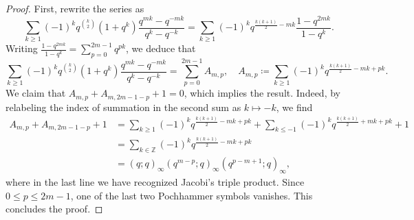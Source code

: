 \documentclass[10pt,a4paper]{amsart}
\newcommand{\Z}{\mathbb{Z}}
\begin{document}
\begin{proof}
    First, rewrite the series as
	\begin{equation}
		\sum_{k \ge 1}
		(-1)^{k}
		q^{\binom{k}{2}} (1 + q^k)
			\frac{q^{mk} - q^{-mk}}{q^k - q^{-k}}
		=
		\sum_{k \ge 1}
			  (-1)^{k}
			q^{\frac{k(k+1)}{2} - mk}
			  \frac{1 - q^{2mk}}{1 - q^k} .
	\end{equation}
	Writing $\frac{1 - q^{2mk}}{1 - q^k} = \sum_{p = 0}^{2m-1} q^{pk}$, we deduce that
	\begin{equation}
		\sum_{k \ge 1}
		(-1)^{k}
		q^{\binom{k}{2}} (1 + q^k)
			\frac{q^{mk} - q^{-mk}}{q^k - q^{-k}}
		=
		\sum_{p = 0}^{2m-1} A_{m,p},
		\quad
		A_{m,p}
		\coloneqq
		\sum_{k \ge 1}
			  (-1)^{k}
			q^{\frac{k(k+1)}{2} - mk + pk}.
	\end{equation}
	We claim that $A_{m,p} + A_{m,2m-1-p} + 1 = 0$, which implies the result. Indeed, by relabeling the index of summation in the second sum as $k \mapsto -k$, we find
	\begin{equation}
	\begin{split}
		A_{m,p} + A_{m,2m-1-p} + 1
		&=
		\sum_{k \ge 1}
			  (-1)^{k}
			q^{\frac{k(k+1)}{2} - mk + pk}
		+
		\sum_{k \le -1}
			  (-1)^{k}
			q^{\frac{k(k+1)}{2} + mk + pk}
		+ 1 \\
		&=
		\sum_{k \in \Z}
			  (-1)^{k}
			q^{\frac{k(k+1)}{2} - mk + pk} \\
		&=
		(q;q)_{\infty} (q^{m-p};q)_{\infty} (q^{p-m+1};q)_{\infty},
	\end{split}
	\end{equation}
	where in the last line we have recognized Jacobi's triple product. Since $0 \le p \le 2m-1$, one of the last two Pochhammer symbols vanishes. This concludes the proof.
\end{proof}
\end{document}
